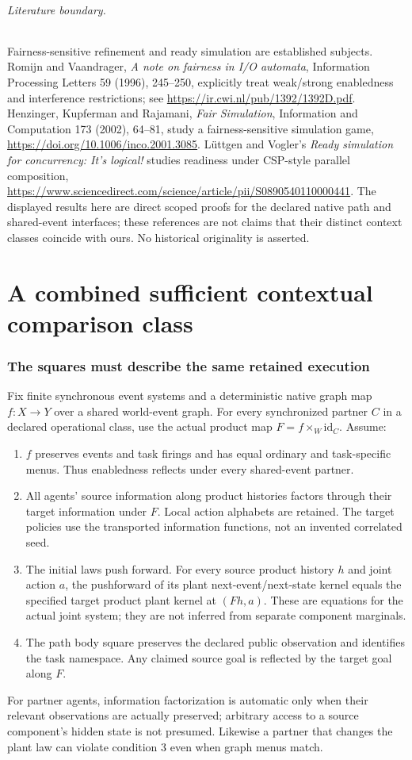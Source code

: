 \documentclass[11pt]{article}
\begin{document}
\paragraph{Literature boundary.} Fairness-sensitive refinement and ready simulation are established subjects. Romijn and Vaandrager, \emph{A note on fairness in I/O automata}, Information Processing Letters 59 (1996), 245--250, explicitly treat weak/strong enabledness and interference restrictions; see \url{https://ir.cwi.nl/pub/1392/1392D.pdf}. Henzinger, Kupferman and Rajamani, \emph{Fair Simulation}, Information and Computation 173 (2002), 64--81, study a fairness-sensitive simulation game, \url{https://doi.org/10.1006/inco.2001.3085}. L\"uttgen and Vogler's \emph{Ready simulation for concurrency: It's logical!} studies readiness under CSP-style parallel composition, \url{https://www.sciencedirect.com/science/article/pii/S0890540110000441}. The displayed results here are direct scoped proofs for the declared native path and shared-event interfaces; these references are not claims that their distinct context classes coincide with ours. No historical originality is asserted.
\part{A combined sufficient contextual comparison class}
\section{The squares must describe the same retained execution}
Fix finite synchronous event systems and a deterministic native graph map $f:X\to Y$ over a shared world-event graph. For every synchronized partner $C$ in a declared operational class, use the actual product map $F=f\times_W\mathrm{id}_C$. Assume:
\begin{enumerate}
\item $f$ preserves events and task firings and has equal ordinary and task-specific menus. Thus enabledness reflects under every shared-event partner.
\item All agents' source information along product histories factors through their target information under $F$. Local action alphabets are retained. The target policies use the transported information functions, not an invented correlated seed.
\item The initial laws push forward. For every source product history $h$ and joint action $a$, the pushforward of its plant next-event/next-state kernel equals the specified target product plant kernel at $(Fh,a)$. These are equations for the actual joint system; they are not inferred from separate component marginals.
\item The path body square preserves the declared public observation and identifies the task namespace. Any claimed source goal is reflected by the target goal along $F$.
\end{enumerate}
For partner agents, information factorization is automatic only when their relevant observations are actually preserved; arbitrary access to a source component's hidden state is not presumed. Likewise a partner that changes the plant law can violate condition 3 even when graph menus match.
\end{document}
